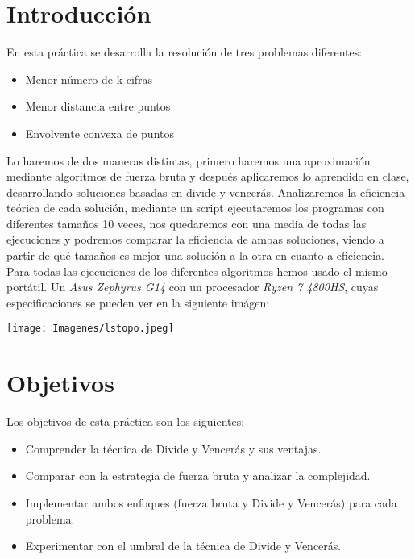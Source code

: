 \documentclass[a4paper,12pt]{article}
\begin{document}

\tableofcontents

\newpage

\section{Introducción}
En esta práctica se desarrolla la resolución de tres problemas diferentes: 

\begin{itemize}
	\item Menor número de k cifras
	\item Menor distancia entre puntos
	\item Envolvente convexa de puntos  
\end{itemize}

Lo haremos de dos maneras distintas, primero haremos una aproximación mediante algoritmos 
de fuerza bruta y después aplicaremos lo aprendido en clase, desarrollando soluciones basadas 
en divide y vencerás. Analizaremos la eficiencia teórica de cada solución, mediante un script
ejecutaremos los programas con diferentes tamaños 10 veces, nos 
quedaremos con una media de todas las ejecuciones y podremos comparar la eficiencia de ambas 
soluciones, viendo a partir de qué tamaños es mejor una solución a la otra en cuanto a eficiencia.
\\

Para todas las ejecuciones de los diferentes algoritmos hemos usado el mismo portátil. Un \textit{Asus Zephyrus G14} con un procesador \textit{Ryzen 7 4800HS}, cuyas especificaciones se pueden ver en la siguiente imágen:\\
\begin{center}
	\texttt{[image: Imagenes/lstopo.jpeg]}
\end{center}



\section{Objetivos}
Los objetivos de esta práctica son los siguientes:
\begin{itemize}
	\item Comprender la técnica de Divide y Vencerás y sus ventajas.
	\item Comparar con la estrategia de fuerza bruta y analizar la complejidad.
	\item Implementar ambos enfoques (fuerza bruta y Divide y Vencerás) para cada problema.
	\item Experimentar con el umbral de la técnica de Divide y Vencerás.
\end{itemize}
\end{document}
